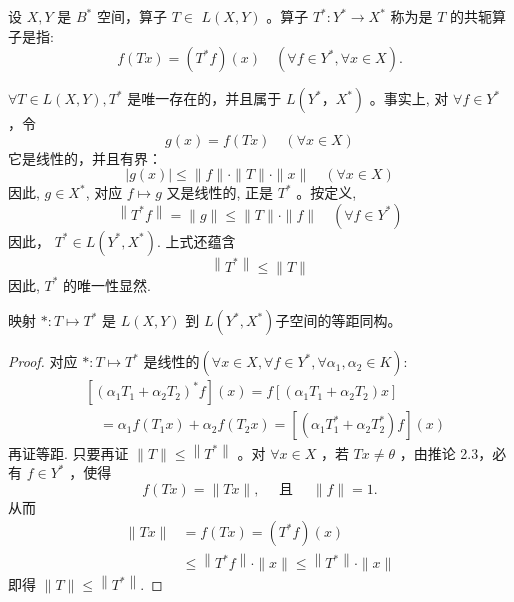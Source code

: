 \documentclass[lang=cn,newtx,10pt,scheme=chinese,thmcnt=chapter]{elegantbook}
\begin{document}
\begin{definition}[共轭算子] 设 $X , Y$ 是 $B^*$ 空间，算子 $T \in$ $L ( X , Y )$ 。算子 $T^*: Y ^* \rightarrow X ^*$ 称为是 $T$ 的共轭算子是指:
\begin{equation*}
f(T x)=\left(T^* f\right)(x) \quad\left(\forall f \in Y ^*, \forall x \in X \right) .
\end{equation*}
\end{definition}
\begin{note}
 $\forall T \in L ( X , Y ), T^*$ 是唯一存在的，并且属于 $L ( Y ^*，X ^*)$ 。事实上, 对 $\forall f \in Y ^*$ ，令
\begin{equation*}
g(x)=f(T x) \quad(\forall x \in X )
\end{equation*}
它是线性的，并且有界：
\begin{equation*}
|g(x)| \leqslant\|f\| \cdot\|T\| \cdot\|x\| \quad(\forall x \in X )
\end{equation*}
因此, $g \in X ^*$, 对应 $f \mapsto g$ 又是线性的, 正是 $T^*$ 。按定义,
\begin{equation*}
\left\|T^* f\right\|=\|g\| \leqslant\|T\| \cdot\|f\| \quad\left(\forall f \in Y ^*\right)
\end{equation*}
因此， $T^* \in L \left( Y ^*, X ^*\right) .$ 上式还蕴含
\begin{equation*}
\left\|T^*\right\| \leqslant\|T\|
\end{equation*}
因此, $T^*$ 的唯一性显然. 
\end{note}

\begin{theorem}
映射 $*: T \mapsto T^*$ 是 $L ( X , Y )$ 到 $L \left( Y ^*, X ^*\right)$子空间的等距同构。
\end{theorem}
\begin{proof}
对应 $*: T \mapsto T^*$ 是线性的$\left(\forall x \in X , \forall f \in Y ^*, \forall \alpha_1, \alpha_2 \in K \right)$:
\begin{equation*}
\begin{aligned}
& {\left[\left(\alpha_1 T_1+\alpha_2 T_2\right)^* f\right](x)=f\left[\left(\alpha_1 T_1+\alpha_2 T_2\right) x\right]} \\
& \quad=\alpha_1 f\left(T_1 x\right)+\alpha_2 f\left(T_2 x\right)=\left[\left(\alpha_1 T_1^*+\alpha_2 T_2^*\right) f\right](x)
\end{aligned}
\end{equation*}
再证等距. 只要再证 $\|T\| \leqslant\left\|T^*\right\|$ 。对 $\forall x \in X$ ，若 $T x \neq \theta$ ，由推论 2.3，必有 $f \in Y ^*$ ，使得
\begin{equation*}
f(T x)=\|T x\|, \quad \text { 且 } \quad\|f\|=1 .
\end{equation*}
从而
\begin{equation*}
\begin{aligned}
\|T x\| & =f(T x)=\left(T^* f\right)(x) \\
& \leqslant\left\|T^* f\right\| \cdot\|x\| \leqslant\left\|T^*\right\| \cdot\|x\|
\end{aligned}
\end{equation*}
即得 $\|T\| \leqslant\left\|T^*\right\|$.
\end{proof}
\end{document}

